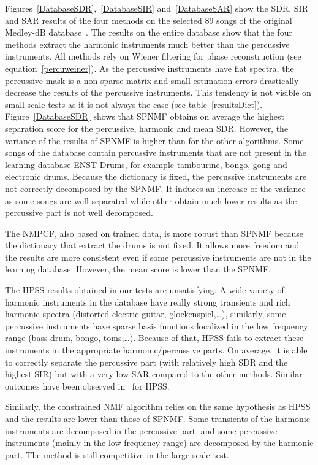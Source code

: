 Figures~\ref{DatabaseSDR},~\ref{DatabaseSIR} and~\ref{DatabaseSAR} show the SDR, SIR and SAR results of the four methods on the selected $89$ songs of the original Medley-dB database~\cite{bittner2014medleydb}. The results on the entire database show that the four methods extract the harmonic instruments much better than the percussive instruments. All methods rely on Wiener filtering for phase reconstruction (see equation~\ref{percuweiner}). As the percussive instruments have flat spectra, the percussive mask is a non sparse matrix and small estimation errors drastically decrease the results of the percussive instruments. This tendency is not visible on small scale tests as it is not always the case (see table~\ref{resultsDict}). 
Figure~\ref{DatabaseSDR} shows that SPNMF obtains on average the highest separation score for the percussive, harmonic and mean SDR. However, the variance of the results of SPNMF is higher than for the other algorithms. Some songs of the database contain percussive instruments that are not present in the learning database ENST-Drums, for example tambourine, bongo, gong and electronic drums. Because the dictionary is fixed, the percussive instruments are not correctly decomposed by the SPNMF. It induces an increase of the variance as some songs are well separated while other obtain much lower results as the percussive part is not well decomposed.

The NMPCF, also based on trained data, is more robust than SPNMF because the dictionary that extract the drums is not fixed. It allows more freedom and the results are more consistent even if some percussive instruments are not in the learning database. However, the mean score is lower than the SPNMF.

The HPSS results obtained in our tests are unsatisfying. A wide variety of harmonic instruments in the database have really strong transients and rich harmonic spectra (distorted electric guitar, glockenspiel,\ldots), similarly, some percussive instruments have sparse basis functions localized in the low frequency range (bass drum, bongo, toms,\ldots). Because of that, HPSS fails to extract these instruments in the appropriate harmonic/percussive parts. On average, it is able to correctly separate the percussive part (with relatively high SDR and the highest SIR) but with a very low SAR compared to the other methods. Similar outcomes have been observed in~\cite{canadas2014percussive} for HPSS.

Similarly, the constrained NMF algorithm relies on the same hypothesis as HPSS and the results are lower than those of SPNMF. Some transients of the harmonic instruments are decomposed in the percussive part, and some percussive instruments (mainly in the low frequency range) are decomposed by the harmonic part. The method is still competitive in the large scale test. 

